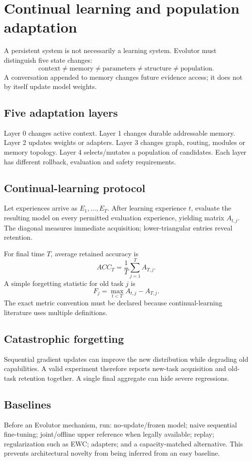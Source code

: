\chapter{Continual learning and population adaptation}

A persistent system is not necessarily a learning system. Evolutor must distinguish five state changes:
\[
\text{context}\neq\text{memory}\neq\text{parameters}\neq\text{structure}\neq\text{population}.
\]
A conversation appended to memory changes future evidence access; it does not by itself update model weights.

\section{Five adaptation layers}
Layer 0 changes active context. Layer 1 changes durable addressable memory. Layer 2 updates weights or adapters. Layer 3 changes graph, routing, modules or memory topology. Layer 4 selects/mutates a population of candidates. Each layer has different rollback, evaluation and safety requirements.

\section{Continual-learning protocol}
Let experiences arrive as $E_1,\ldots,E_T$. After learning experience $t$, evaluate the resulting model on every permitted evaluation experience, yielding matrix $A_{t,j}$. The diagonal measures immediate acquisition; lower-triangular entries reveal retention.

For final time $T$, average retained accuracy is
\[
ACC_T=\frac1T\sum_{j=1}^{T}A_{T,j}.
\]
A simple forgetting statistic for old task $j$ is
\[
F_j=\max_{t<T}A_{t,j}-A_{T,j}.
\]
The exact metric convention must be declared because continual-learning literature uses multiple definitions.

\section{Catastrophic forgetting}
Sequential gradient updates can improve the new distribution while degrading old capabilities. A valid experiment therefore reports new-task acquisition and old-task retention together. A single final aggregate can hide severe regressions.

\section{Baselines}
Before an Evolutor mechanism, run: no-update/frozen model; naive sequential fine-tuning; joint/offline upper reference when legally available; replay; regularization such as EWC; adapters; and a capacity-matched alternative. This prevents architectural novelty from being inferred from an easy baseline.

